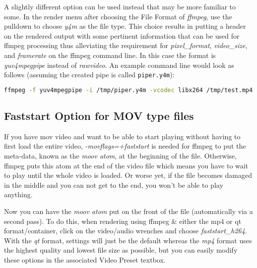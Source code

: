 A slightly different option can be used instead that may be more familiar to some.  In the render menu after choosing the File Format of \textit{ffmpeg}, use the pulldown to choose \textit{y4m} as the file type.  This choice results in putting a header on the rendered output with some pertinent information that can be used for ffmpeg processing thus alleviating the requirement for \textit{pixel\_format}, \textit{video\_size}, and \textit{framerate} on the ffmpeg command line.  In this case the format is \textit{yuv4mpegpipe} instead of \textit{rawvideo}.  An example command line would look as follows (assuming the created pipe is called \texttt{piper.y4m}):
\begin{lstlisting}[language=bash,numbers=none]
ffmpeg -f yuv4mpegpipe -i /tmp/piper.y4m -vcodec libx264 /tmp/test.mp4
\end{lstlisting}

\subsection{Faststart Option for MOV type files}%
\label{sub:faststart_option_mov0}

If you have mov video and want to be able to start playing without having to first load the entire video, \textit{-movflags=+faststart} is needed for ffmpeg to put the meta-data, known as the \textit{moov atom}, at the beginning of the file.  Otherwise, ffmpeg puts this atom at the end of the video file which means you have to wait to play until the whole video is loaded.  Or worse yet, if the file becomes damaged in the middle and you can not get to the end, you won’t be able to play anything.

Now you can have the \textit{moov atom} put on the front of the file (automatically via a second pass).  To do this, when rendering using ffmpeg \& either the mp4 or qt format/container, click on the video/audio wrenches and choose \textit{faststart\_h264}.   With the \textit{qt} format, settings will just be the default whereas the \textit{mp4} format uses the highest quality and lowest file size as possible, but you can easily modify these options in the associated Video Preset textbox.

